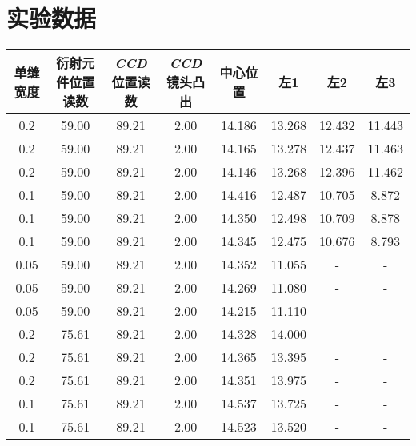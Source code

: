 \documentclass[a4paper]{ltxdoc}
\begin{document}
\section{实验数据}
\begin{tabular}{|c|c|c|c|c|c|c|c|}
    \hline 单缝宽度 & 衍射元件位置读数 & \textit{CCD}位置读数 & \textit{CCD}镜头凸出 & 中心位置 & 左1    & 左2    & 左3    \\
    \hline 0.2      & 59.00            & 89.21                & 2.00                 & 14.186   & 13.268 & 12.432 & 11.443 \\
    \hline 0.2      & 59.00            & 89.21                & 2.00                 & 14.165   & 13.278 & 12.437 & 11.463 \\
    \hline 0.2      & 59.00            & 89.21                & 2.00                 & 14.146   & 13.268 & 12.396 & 11.462 \\
    \hline 0.1      & 59.00            & 89.21                & 2.00                 & 14.416   & 12.487 & 10.705 & 8.872  \\
    \hline 0.1      & 59.00            & 89.21                & 2.00                 & 14.350   & 12.498 & 10.709 & 8.878  \\
    \hline 0.1      & 59.00            & 89.21                & 2.00                 & 14.345   & 12.475 & 10.676 & 8.793  \\
    \hline 0.05     & 59.00            & 89.21                & 2.00                 & 14.352   & 11.055 & -      & -      \\
    \hline 0.05     & 59.00            & 89.21                & 2.00                 & 14.269   & 11.080 & -      & -      \\
    \hline 0.05     & 59.00            & 89.21                & 2.00                 & 14.215   & 11.110 & -      & -      \\\hline
    \hline 0.2      & 75.61            & 89.21                & 2.00                 & 14.328   & 14.000 & -      & -      \\
    \hline 0.2      & 75.61            & 89.21                & 2.00                 & 14.365   & 13.395 & -      & -      \\
    \hline 0.2      & 75.61            & 89.21                & 2.00                 & 14.351   & 13.975 & -      & -      \\
    \hline 0.1      & 75.61            & 89.21                & 2.00                 & 14.537   & 13.725 & -      & -      \\
    \hline 0.1      & 75.61            & 89.21                & 2.00                 & 14.523   & 13.520 & -      & -      \\

\end{tabular}
\end{document}
